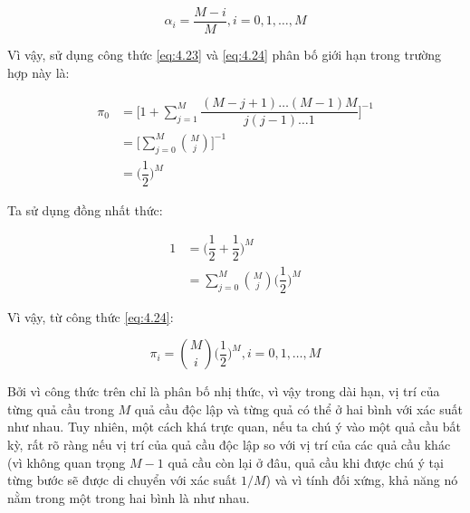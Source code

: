 \documentclass[14pt, a4paper]{article}
\numberwithin{equation}{section}
\numberwithin{figure}{section}
\theoremstyle{sltheorem}
\theoremstyle{soltheorem}
\numberwithin{dl}{section}
\numberwithin{md}{section}
\numberwithin{vd}{section}
\begin{document}
    \begin{equation*}
        \alpha_i = \dfrac{M - i}{M}, i = 0, 1, \dots, M
    \end{equation*}

    Vì vậy, sử dụng công thức \ref{eq:4.23} và \ref{eq:4.24} phân bố giới hạn trong trường hợp này là:

    \begin{equation*}
        \begin{aligned}
            \pi_0 &= \Bigg \lbrack 1 + \sum_{j=1}^M \dfrac{(M-j+1) \dots (M-1)M}{j (j-1) \dots 1} \Bigg \rbrack^{-1} \\
            &= \Bigg \lbrack \sum_{j=0}^M \binom Mj \Bigg \rbrack^{-1} \\
            &= \Bigg ( \dfrac{1}{2} \Bigg )^M
        \end{aligned}
    \end{equation*}

    Ta sử dụng đồng nhất thức:

    \begin{equation*}
        \begin{aligned}
            1 &= \Big ( \dfrac{1}{2} + \dfrac{1}{2} \Big)^M \\
            &= \sum_{j=0}^M \binom{M}{j} \Bigg ( \dfrac{1}{2} \Bigg )^M
        \end{aligned}
    \end{equation*}

    Vì vậy, từ công thức \ref{eq:4.24}:

    \begin{equation*}
        \pi_i = \binom{M}{i} \Bigg ( \dfrac{1}{2} \Bigg)^M, i = 0, 1, \dots, M
    \end{equation*}

    Bởi vì công thức trên chỉ là phân bố nhị thức, vì vậy trong dài hạn, vị trí của từng quả cầu trong $M$ quả cầu độc lập và từng quả có thể ở hai bình với xác suất như nhau.
    Tuy nhiên, một cách khá trực quan, nếu ta chú ý vào một quả cầu bất kỳ, rất rõ ràng nếu vị trí của quả cầu độc lập so với vị trí của các quả cầu khác (vì không quan trọng $M-1$ quả cầu còn lại ở đâu, quả cầu khi được chú ý tại từng bước sẽ được di chuyển với xác suất $1/M$) và vì tính đối xứng, khả năng nó nằm trong một trong hai bình là như nhau.
\end{document}
